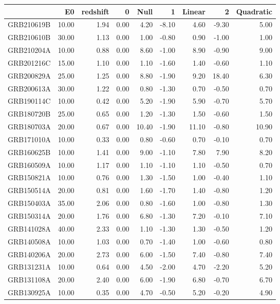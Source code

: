 \begin{tabular}{lrrrrrrrr}
\toprule
 & E0 & redshift & 0 & Null & 1 & Linear & 2 & Quadratic \\
\midrule
GRB210619B & 10.00 & 1.94 & 0.00 & 4.20 & -8.10 & 4.60 & -9.30 & 5.00 \\
GRB210610B & 30.00 & 1.13 & 0.00 & 1.00 & -0.80 & 0.90 & -1.00 & 1.00 \\
GRB210204A & 10.00 & 0.88 & 0.00 & 8.60 & -1.00 & 8.90 & -0.90 & 9.00 \\
GRB201216C & 15.00 & 1.10 & 0.00 & 1.10 & -1.60 & 1.40 & -0.60 & 1.10 \\
GRB200829A & 25.00 & 1.25 & 0.00 & 8.80 & -1.90 & 9.20 & 18.40 & 6.30 \\
GRB200613A & 30.00 & 1.22 & 0.00 & 0.80 & -1.30 & 0.70 & -0.50 & 0.70 \\
GRB190114C & 10.00 & 0.42 & 0.00 & 5.20 & -1.90 & 5.90 & -0.70 & 5.70 \\
GRB180720B & 25.00 & 0.65 & 0.00 & 1.20 & -1.30 & 1.50 & -0.60 & 1.50 \\
GRB180703A & 20.00 & 0.67 & 0.00 & 10.40 & -1.90 & 11.10 & -0.80 & 10.90 \\
GRB171010A & 10.00 & 0.33 & 0.00 & 0.80 & -0.60 & 0.70 & -0.10 & 0.70 \\
GRB160625B & 10.00 & 1.41 & 0.00 & 9.00 & -1.10 & 7.80 & 7.90 & 8.20 \\
GRB160509A & 10.00 & 1.17 & 0.00 & 1.10 & -1.10 & 1.10 & -0.50 & 0.70 \\
GRB150821A & 10.00 & 0.76 & 0.00 & 1.30 & -1.50 & 1.00 & -0.40 & 1.10 \\
GRB150514A & 20.00 & 0.81 & 0.00 & 1.60 & -1.70 & 1.40 & -0.80 & 1.20 \\
GRB150403A & 35.00 & 2.06 & 0.00 & 0.80 & -1.60 & 1.00 & -0.80 & 1.30 \\
GRB150314A & 20.00 & 1.76 & 0.00 & 6.80 & -1.30 & 7.20 & -0.10 & 7.10 \\
GRB141028A & 40.00 & 2.33 & 0.00 & 1.10 & -1.30 & 1.30 & -0.50 & 1.20 \\
GRB140508A & 10.00 & 1.03 & 0.00 & 0.70 & -1.40 & 1.00 & -0.60 & 0.80 \\
GRB140206A & 20.00 & 2.73 & 0.00 & 6.00 & -1.50 & 7.40 & -0.80 & 7.40 \\
GRB131231A & 10.00 & 0.64 & 0.00 & 4.50 & -2.00 & 4.70 & -2.20 & 5.20 \\
GRB131108A & 20.00 & 2.40 & 0.00 & 6.00 & -1.90 & 6.80 & -0.70 & 6.70 \\
GRB130925A & 10.00 & 0.35 & 0.00 & 4.70 & -0.50 & 5.20 & -0.20 & 4.90 \\

\end{tabular}
